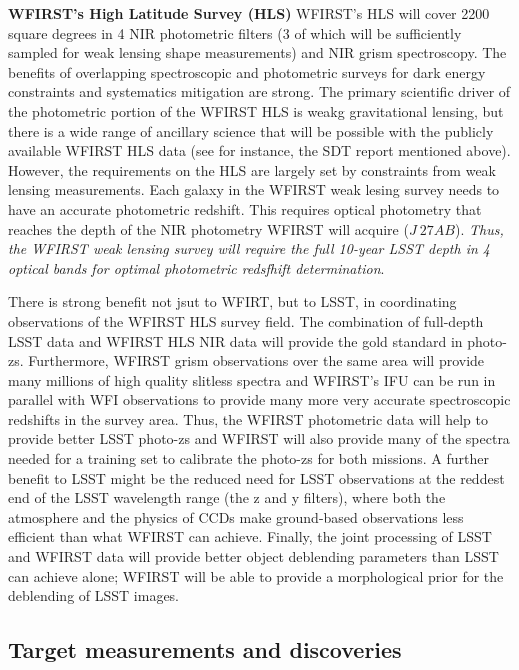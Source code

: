  \textbf{WFIRST's High Latitude Survey (HLS)}
 WFIRST's HLS will cover 2200 square degrees in 4 NIR photometric filters (3 of which will be sufficiently sampled for weak lensing shape measurements) and NIR grism spectroscopy.  The benefits of overlapping spectroscopic and photometric surveys for dark energy constraints and systematics mitigation are strong.  The primary scientific driver of the photometric portion of the WFIRST HLS is weakg gravitational lensing, but there is a wide range of ancillary science that will be possible with the publicly available WFIRST HLS data (see for instance, the SDT report mentioned above).  However, the requirements on the HLS are largely set by constraints from weak lensing measurements.  Each galaxy in the WFIRST weak lesing survey needs to have an accurate photometric redshift.  This requires optical photometry that reaches the depth of the NIR photometry WFIRST will acquire ($J~27AB$).  \emph{Thus, the WFIRST weak lensing survey will require the full  10-year LSST depth in 4 optical bands for optimal photometric redsfhift determination}. 
 
There is strong benefit not jsut to WFIRT, but to LSST, in coordinating observations of the WFIRST HLS survey field. The combination of full-depth LSST data and WFIRST HLS NIR data will provide the gold standard in photo-zs.  Furthermore, WFIRST grism observations over the same area will provide many millions of high quality slitless spectra and WFIRST’s IFU can be run in parallel with WFI observations to provide many more very accurate spectroscopic redshifts in the survey area.  Thus, the WFIRST photometric data will help to provide better LSST photo-zs and  WFIRST will also provide many of the spectra needed for a training set to calibrate the photo-zs for both missions.  A further benefit to LSST might be the reduced need for LSST observations at the reddest end of the LSST wavelength range (the z and y filters), where both the atmosphere and the physics of CCDs make ground-based observations less efficient than what WFIRST can achieve. Finally, the joint processing of LSST and WFIRST data will provide better object deblending parameters than LSST can achieve alone; WFIRST will be able to provide a morphological prior for the deblending of LSST images.


\subsection{Target measurements and discoveries}
\label{sec:\secname:targets}

